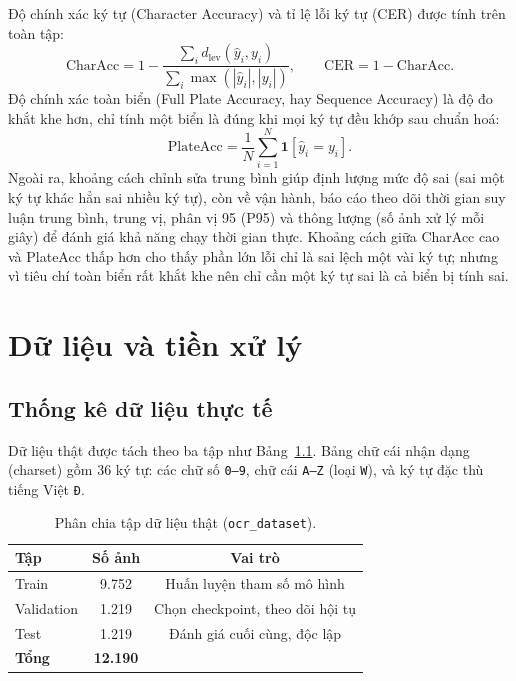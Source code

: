 \documentclass[12pt,a4paper]{report}
\begin{document}
Độ chính xác ký tự (Character Accuracy) và tỉ lệ lỗi ký tự (CER) được tính trên toàn tập:
\begin{equation}
\text{CharAcc} = 1 - \frac{\sum_i d_\text{lev}(\hat{y}_i, y_i)}{\sum_i \max(|\hat{y}_i|, |y_i|)},
\qquad
\text{CER} = 1 - \text{CharAcc}.
\end{equation}
Độ chính xác toàn biển (Full Plate Accuracy, hay Sequence Accuracy) là độ đo khắt khe hơn, chỉ tính một biển là đúng khi mọi ký tự đều khớp sau chuẩn hoá:
\begin{equation}
\text{PlateAcc} = \frac{1}{N}\sum_{i=1}^{N} \mathbf{1}\!\left[\hat{y}_i = y_i\right].
\end{equation}
Ngoài ra, khoảng cách chỉnh sửa trung bình giúp định lượng mức độ sai (sai một ký tự khác hẳn sai nhiều ký tự), còn về vận hành, báo cáo theo dõi thời gian suy luận trung bình, trung vị, phân vị 95 (P95) và thông lượng (số ảnh xử lý mỗi giây) để đánh giá khả năng chạy thời gian thực. Khoảng cách giữa CharAcc cao và PlateAcc thấp hơn cho thấy phần lớn lỗi chỉ là sai lệch một vài ký tự; nhưng vì tiêu chí toàn biển rất khắt khe nên chỉ cần một ký tự sai là cả biển bị tính sai.

\chapter{Dữ liệu và tiền xử lý}

\section{Thống kê dữ liệu thực tế}
Dữ liệu thật được tách theo ba tập như Bảng~\ref{tab:data}. Bảng chữ cái nhận dạng (charset) gồm 36 ký tự: các chữ số \texttt{0--9}, chữ cái \texttt{A--Z} (loại \texttt{W}), và ký tự đặc thù tiếng Việt \texttt{Đ}.

\begin{table}[H]
\centering
\caption{Phân chia tập dữ liệu thật (\texttt{ocr\_dataset}).}
\label{tab:data}
\begin{tabular}{lcc}
\toprule
\textbf{Tập} & \textbf{Số ảnh} & \textbf{Vai trò} \\
\midrule
Train & 9.752 & Huấn luyện tham số mô hình \\
Validation & 1.219 & Chọn checkpoint, theo dõi hội tụ \\
Test & 1.219 & Đánh giá cuối cùng, độc lập \\
\midrule
\textbf{Tổng} & \textbf{12.190} & \\
\bottomrule
\end{tabular}
\end{table}
\end{document}
